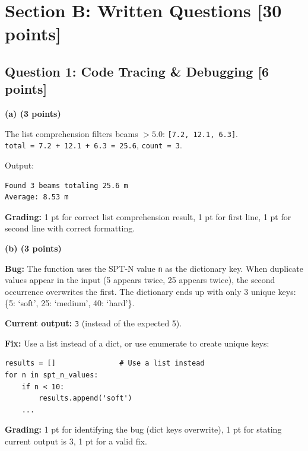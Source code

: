 \documentclass[11pt,a4paper]{article}
\begin{document}
\newpage
\section*{Section B: Written Questions [30 points]}

\subsection*{Question 1: Code Tracing \& Debugging [6 points]}

\noindent\textbf{(a) (3 points)}

\begin{answerbox}
The list comprehension filters beams $> 5.0$: \lstinline{[7.2, 12.1, 6.3]}.\\
\lstinline{total = 7.2 + 12.1 + 6.3 = 25.6}, \lstinline{count = 3}.

Output:
\begin{lstlisting}[backgroundcolor=\color{white},frame=none]
Found 3 beams totaling 25.6 m
Average: 8.53 m
\end{lstlisting}

\textbf{Grading:} 1 pt for correct list comprehension result, 1 pt for first line, 1 pt for second line with correct formatting.
\end{answerbox}

\vspace{0.3cm}

\noindent\textbf{(b) (3 points)}

\begin{answerbox}
\textbf{Bug:} The function uses the SPT-N value \lstinline{n} as the dictionary key. When duplicate values appear in the input (5 appears twice, 25 appears twice), the second occurrence overwrites the first. The dictionary ends up with only 3 unique keys: \{5: `soft', 25: `medium', 40: `hard'\}.

\textbf{Current output:} \lstinline{3} (instead of the expected 5).

\textbf{Fix:} Use a list instead of a dict, or use enumerate to create unique keys:
\begin{lstlisting}[backgroundcolor=\color{white},frame=none]
results = []               # Use a list instead
for n in spt_n_values:
    if n < 10:
        results.append('soft')
    ...
\end{lstlisting}

\textbf{Grading:} 1 pt for identifying the bug (dict keys overwrite), 1 pt for stating current output is 3, 1 pt for a valid fix.
\end{answerbox}
\end{document}
